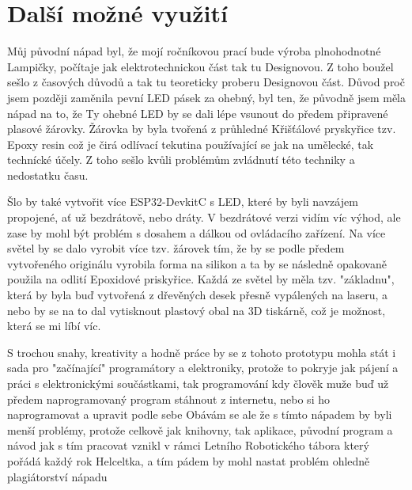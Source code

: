 \chapter{Další možné využití}

Můj původní nápad byl, že mojí ročníkovou prací bude výroba plnohodnotné Lampičky, počítaje jak elektrotechnickou část tak tu Designovou. Z toho boužel sešlo z časových důvodů a tak tu teoreticky proberu Designovou část. 
Důvod proč jsem později zaměnila pevní LED pásek za ohebný, byl ten, že původně jsem měla nápad na to, že Ty ohebné LED by se dali lépe vsunout do předem připravené plasové žárovky. Žárovka by byla tvořená z průhledné Křišťálové pryskyřice tzv. Epoxy resin\cite{epoxyresin} což je čirá odlívací tekutina používající se jak na umělecké, tak technícké účely. Z toho sešlo kvůli problémům zvládnutí této techniky a nedostatku času. %


Šlo by také vytvořit více ESP32-DevkitC s LED, které by byli navzájem propojené, ať už bezdrátově, nebo dráty. V bezdrátové verzi vidím víc výhod, ale zase by mohl být problém s dosahem a dálkou od ovládacího zařízení. 
Na více světel by se dalo vyrobit více tzv. žárovek tím, že by se podle předem vytvořeného originálu vyrobila forma na silikon a ta by se následně opakovaně použila na odlití Epoxidové priskyřice. Každá ze světel by měla tzv. "základnu", která by byla buď vytvořená z dřevěných desek přesně vypálených na laseru, a nebo by se na to dal vytisknout plastový obal na 3D tiskárně, což je možnost, která se mi líbí víc. 
	

S trochou snahy, kreativity a hodně práce by se z tohoto prototypu mohla stát i sada pro "začínající" programátory a elektroniky, protože to pokryje jak pájení a práci s elektronickými součástkami, tak programování kdy člověk muže buď už předem naprogramovaný program stáhnout z internetu, nebo si ho naprogramovat a upravit podle sebe Obávám se ale že s tímto nápadem by byli menší problémy, protože celkově jak knihovny, tak aplikace, původní program a návod jak s tím pracovat vznikl v rámci Letního Robotického tábora který pořádá každý rok Helceltka, a tím pádem by mohl nastat problém ohledně plagiátorství nápadu 


